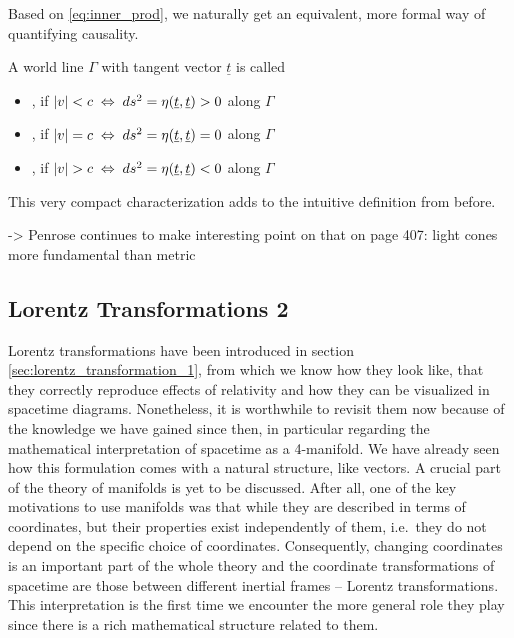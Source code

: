 Based on \eqref{eq:inner_prod}, we naturally get an equivalent, more formal way of quantifying causality.
\begin{defi}
	A world line $\Gamma$ with tangent vector $\underline{t}$ is called
	\begin{itemize}
		\item {}, if $\abs{v} < c \; \Leftrightarrow \; ds^2 = \eta(\underline{t}, \underline{t}) > 0$ along $\Gamma$
		
		
		\item {}, if $\abs{v} = c \; \Leftrightarrow \; ds^2 = \eta(\underline{t}, \underline{t}) = 0$ along $\Gamma$
		
		
		\item {}, if $\abs{v} > c \; \Leftrightarrow \; ds^2 = \eta(\underline{t}, \underline{t}) < 0$ along $\Gamma$
	\end{itemize}
\end{defi}
This very compact characterization adds to the intuitive definition from before.


-> Penrose continues to make interesting point on that on page 407: light cones more fundamental than metric



		\subsection{Lorentz Transformations 2}\label{subsec:lorentz_transformation_2}
Lorentz transformations have been introduced in section \ref{sec:lorentz_transformation_1}, from which we know how they look like, that they correctly reproduce effects of relativity and how they can be visualized in spacetime diagrams. Nonetheless, it is worthwhile to revisit them now because of the knowledge we have gained since then, in particular regarding the mathematical interpretation of spacetime as a 4-manifold. We have already seen how this formulation comes with a natural structure, like vectors. A crucial part of the theory of manifolds is yet to be discussed. After all, one of the key motivations to use manifolds was that while they are described in terms of coordinates, but their properties exist independently of them, i.e.~they do not depend on the specific choice of coordinates. Consequently, changing coordinates is an important part of the whole theory and the coordinate transformations of spacetime are those between different inertial frames -- Lorentz transformations. This interpretation is the first time we encounter the more general role they play since there is a rich mathematical structure related to them.



